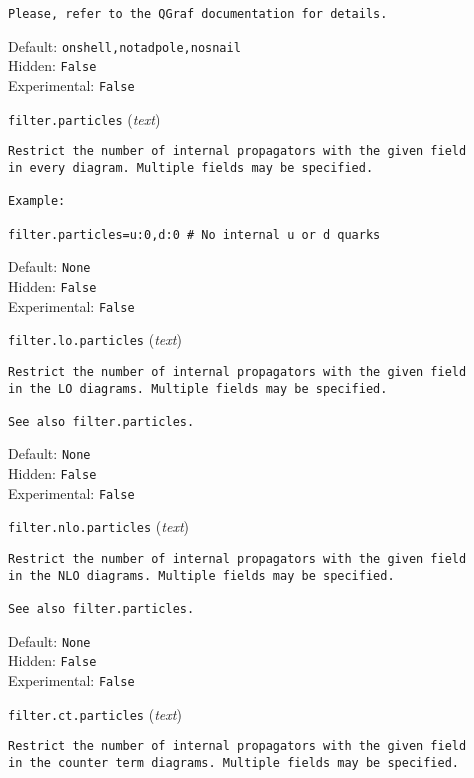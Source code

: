 \begin{basedescript}{\desclabelstyle{\pushlabel}}
\begin{verbatim}
Please, refer to the QGraf documentation for details.
\end{verbatim}
Default: \verb|onshell,notadpole,nosnail|
\\Hidden: \verb|False|
\\Experimental: \verb|False|
\\\item[\colorbox{gray!30}{\texttt{filter.particles}}] (\textit{text})
\begin{verbatim}
Restrict the number of internal propagators with the given field
in every diagram. Multiple fields may be specified.

Example:

filter.particles=u:0,d:0 # No internal u or d quarks
\end{verbatim}
Default: \verb|None|
\\Hidden: \verb|False|
\\Experimental: \verb|False|
\\\item[\colorbox{gray!30}{\texttt{filter.lo.particles}}] (\textit{text})
\begin{verbatim}
Restrict the number of internal propagators with the given field
in the LO diagrams. Multiple fields may be specified.

See also filter.particles.
\end{verbatim}
Default: \verb|None|
\\Hidden: \verb|False|
\\Experimental: \verb|False|
\\\item[\colorbox{gray!30}{\texttt{filter.nlo.particles}}] (\textit{text})
\begin{verbatim}
Restrict the number of internal propagators with the given field
in the NLO diagrams. Multiple fields may be specified.

See also filter.particles.
\end{verbatim}
Default: \verb|None|
\\Hidden: \verb|False|
\\Experimental: \verb|False|
\\\item[\colorbox{gray!30}{\texttt{filter.ct.particles}}] (\textit{text})
\begin{verbatim}
Restrict the number of internal propagators with the given field
in the counter term diagrams. Multiple fields may be specified.


\end{verbatim}
\end{basedescript}
